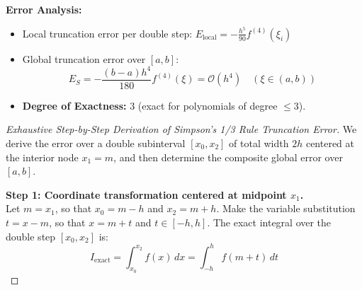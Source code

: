 \begin{theorembox}
\textbf{Error Analysis:}
\begin{itemize}[noitemsep]
    \item Local truncation error per double step: $E_{\text{local}} = -\frac{h^5}{90} f^{(4)}(\xi_i)$
    \item Global truncation error over $[a, b]$:
    \begin{equation}
        \boxed{E_S = -\frac{(b-a)h^4}{180} f^{(4)}(\xi) = \mathcal{O}(h^4)} \quad (\xi \in (a, b))
    \end{equation}
    \item \textbf{Degree of Exactness:} $3$ (exact for polynomials of degree $\le 3$).
\end{itemize}
\end{theorembox}

\begin{proof}[Exhaustive Step-by-Step Derivation of Simpson's 1/3 Rule Truncation Error]
We derive the error over a double subinterval $[x_0, x_2]$ of total width $2h$ centered at the interior node $x_1 = m$, and then determine the composite global error over $[a, b]$.

\medskip
\noindent\textbf{Step 1: Coordinate transformation centered at midpoint $x_1$.} \\
Let $m = x_1$, so that $x_0 = m - h$ and $x_2 = m + h$. Make the variable substitution $t = x - m$, so that $x = m + t$ and $t \in [-h, h]$.
The exact integral over the double step $[x_0, x_2]$ is:
\begin{equation}
    I_{\text{exact}} = \int_{x_0}^{x_2} f(x) \, dx = \int_{-h}^h f(m + t) \, dt
\end{equation}


\end{proof}
